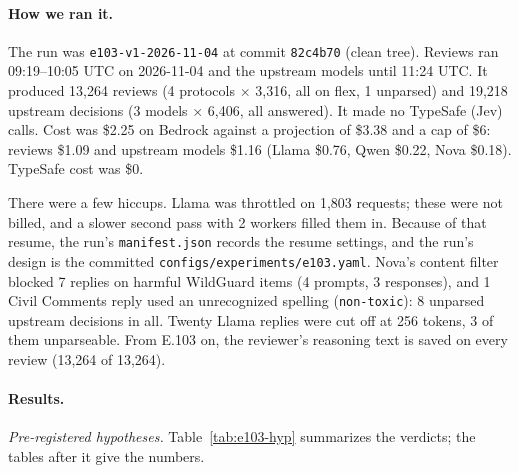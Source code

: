 \documentclass[11pt]{article}
\renewcommand{\_}{\origunderscore\allowbreak}
\begin{document}
\paragraph{How we ran it.}
The run was \texttt{e103-v1-2026-11-04} at commit \texttt{82c4b70} (clean tree). Reviews ran 09:19--10:05 UTC on 2026-11-04 and the upstream models until 11:24 UTC. It produced 13,264 reviews (4 protocols $\times$ 3,316, all on flex, 1 unparsed) and 19,218 upstream decisions (3 models $\times$ 6,406, all answered). It made no TypeSafe (Jev) calls. Cost was \$2.25 on Bedrock against a projection of \$3.38 and a cap of \$6: reviews \$1.09 and upstream models \$1.16 (Llama \$0.76, Qwen \$0.22, Nova \$0.18). TypeSafe cost was \$0.

There were a few hiccups. Llama was throttled on 1,803 requests; these were not billed, and a slower second pass with 2 workers filled them in. Because of that resume, the run's \texttt{manifest.json} records the resume settings, and the run's design is the committed \texttt{configs/\allowbreak{}experiments/\allowbreak{}e103.yaml}. Nova's content filter blocked 7 replies on harmful WildGuard items (4 prompts, 3 responses), and 1 Civil Comments reply used an unrecognized spelling (\texttt{non-toxic}): 8 unparsed upstream decisions in all. Twenty Llama replies were cut off at 256 tokens, 3 of them unparseable. From E.103 on, the reviewer's reasoning text is saved on every review (13,264 of 13,264).

\paragraph{Results.}
\emph{Pre-registered hypotheses.} Table~\ref{tab:e103-hyp} summarizes the verdicts; the tables after it give the numbers.
\end{document}
